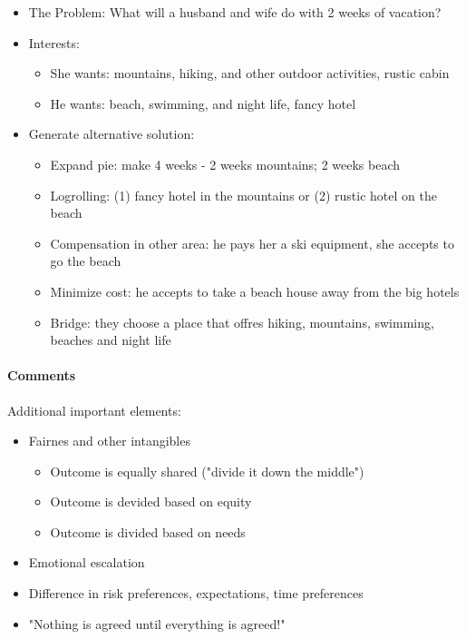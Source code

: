 \begin{example}
    \begin{itemize}
        \item The Problem: What will a husband and wife do with 2 weeks of vacation?
        \item Interests:
            \begin{itemize}
                \item She wants: mountains, hiking, and other outdoor activities, rustic cabin
                \item He wants: beach, swimming, and night life, fancy hotel
            \end{itemize}
        \item Generate alternative solution:
            \begin{itemize}
                \item Expand pie: make 4 weeks - 2 weeks mountains; 2 weeks beach
                \item Logrolling: (1) fancy hotel in the mountains or (2) rustic hotel on the beach
                \item Compensation in other area: he pays her a ski equipment, she accepts to go the beach
                \item Minimize cost: he accepts to take a beach house away from the big hotels
                \item Bridge: they choose a place that offres hiking, mountains, swimming, beaches and night life
            \end{itemize}
    \end{itemize}
\end{example}

\paragraph{Comments}
Additional important elements:
\begin{itemize}
    \item Fairnes and other intangibles
        \begin{itemize}
            \item Outcome is equally shared ("divide it down the middle")
            \item Outcome is devided based on equity
            \item Outcome is divided based on needs
        \end{itemize}
    \item Emotional escalation
    \item Difference in risk preferences, expectations, time preferences
    \item "Nothing is agreed until everything is agreed!"
\end{itemize}

